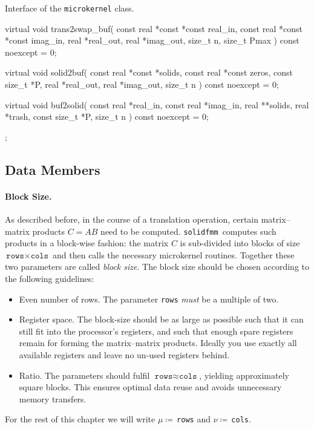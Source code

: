 \documentclass{scrbook}
\newcommand{\solidfmm}{\texttt{solidfmm}}
\begin{document}
\begin{cppcode}{Interface of the \lstinline|microkernel| class.}
{    virtual void trans2swap_buf( const real *const *const real_in, 
                                 const real *const *const imag_in,
                                       real *real_out, real *imag_out,
                                 size_t n, size_t Pmax ) const noexcept = 0;

    virtual void solid2buf( const real *const *solids,
                  const real *const  zeros, const size_t *P,
                  real *real_out, real *imag_out, size_t n ) const noexcept = 0;

    virtual void buf2solid( const real *real_in, const real *imag_in, 
                            real **solids, real *trash,
                            const size_t *P, size_t n ) const noexcept = 0;
};
\end{cppcode}

\subsection{Data Members}\label{subsec:microkernel-data-members}
\paragraph{Block Size.}
As described before, in the course of a translation operation, certain
matrix--matrix products $C=AB$ need to be computed. \solidfmm\ computes such
products in a block-wise fashion: the matrix $C$ is sub-divided into blocks of
size  $\texttt{rows}\times\texttt{cols}$ and then calls the necessary
microkernel routines. Together these two parameters are called \emph{block
size}. The block size should be chosen according to the following guidelines:
\begin{itemize}
\item Even number of rows. The parameter \lstinline|rows| \emph{must} be a
multiple of two. 
\item Register space. The block-size should be as large as possible
such that it can still fit into the processor's registers, and such
that enough spare registers remain for forming the matrix--matrix
products. Ideally you use exactly all available registers and leave
no un-used registers behind.
\item Ratio. The parameters should fulfil $\texttt{rows}\approx\texttt{cols}$,
yielding approximately square blocks. This ensures optimal data reuse and
avoids unnecessary memory transfers.
\end{itemize}

For the rest of this chapter we will write $\mu\coloneqq$\,\lstinline|rows| and
$\nu\coloneqq$\,\lstinline|cols|.
\end{document}

